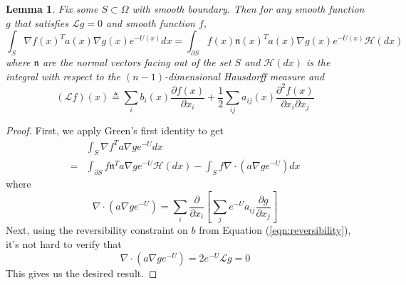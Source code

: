 \documentclass[nofootinbib,english, aip, jcp, priprint, graphicx,floatfix]{revtex4-1}
\newtheorem{lemma}{Lemma}
\theoremstyle{plain}
\theoremstyle{definition}
\theoremstyle{plain}
\newcommand{\normal}{{\mathfrak{n}}}
\newcommand{\hausdorffmeasure}{\mathscr{H}(dx)}
\begin{document}
\begin{lemma}  \label{lem:greenident}Fix some $S \subset \Omega$ with smooth boundary.  Then for any smooth function $g$ that satisfies $\mathcal{L}g = 0$ and smooth function $f$,
\begin{equation*}
\int_{S} \nabla f(x)^T a(x) \nabla g(x) e^{-U(x)}dx = \int_{\partial S} f(x) \normal(x)^T a(x) \nabla g(x) e^{-U(x)}\hausdorffmeasure
\end{equation*}
where $\normal$ are the normal vectors facing out of the set $S$ and $\hausdorffmeasure$ is the integral with respect to the $(n-1)$-dimensional Hausdorff measure and 
\[
(\mathcal{L}f)(x) \triangleq \sum_i b_i(x) \frac{\partial f (x)}{\partial x_i} + 
    \frac{1}{2} \sum_{ij}a_{ij}(x)\frac{\partial^2 f(x)}{\partial x_i \partial x_j} 
\]
\end{lemma}
\begin{proof}
First, we apply Green's first identity to get
\begin{align*}
	 &\int_{S} \nabla f^T a \nabla g e^{-U} dx\\
	=&\int_{\partial S}f \normal^T a \nabla g e^{-U} \hausdorffmeasure - \int_{S} f \nabla \cdot (a \nabla g e^{-U}) dx
\end{align*}
where
\begin{equation*}
	\nabla \cdot (a \nabla g e^{-U}) = \sum_{i}\frac{\partial}{\partial x_i}\left[\sum_{j}e^{-U}a_{i j}\frac{\partial g}{\partial x_j}\right]
\end{equation*}
Next, using the reversibility constraint on $b$ from Equation (\ref{eqn:reversibility}), it's not hard to verify that 
\begin{equation*}
	\nabla \cdot (a \nabla g e^{-U}) = 2e^{-U}\mathcal{L} g = 0
\end{equation*}
This gives us the desired result.
\end{proof}
\end{document}
